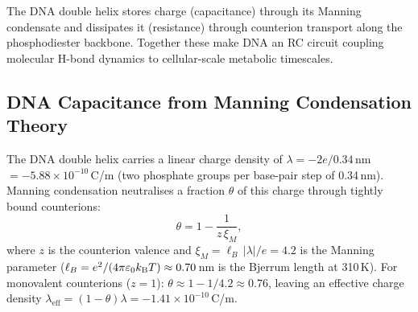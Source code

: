 The DNA double helix stores charge (capacitance) through its Manning condensate
and dissipates it (resistance) through counterion transport along the
phosphodiester backbone. Together these make DNA an RC circuit coupling
molecular H-bond dynamics to cellular-scale metabolic timescales.

\subsection{DNA Capacitance from Manning Condensation Theory}
\label{ssec:dna_capacitance}

The DNA double helix carries a linear charge density of
$\lambda = -2e / 0.34$\,nm $= -5.88 \times 10^{-10}$\,C/m (two phosphate
groups per base-pair step of 0.34\,nm). Manning condensation \citep{Manning1969}
neutralises a fraction $\theta$ of this charge through tightly bound counterions:
\begin{equation}
  \theta = 1 - \frac{1}{z\,\xi_M},
  \label{eq:manning_condensation}
\end{equation}
where $z$ is the counterion valence and $\xi_M = \ell_B\,|\lambda|/e = 4.2$
is the Manning parameter ($\ell_B = e^2/(4\pi\varepsilon_0k_{\mathrm{B}} T) \approx 0.70$\,nm
is the Bjerrum length at 310\,K). For monovalent counterions ($z = 1$):
$\theta \approx 1 - 1/4.2 \approx 0.76$, leaving an effective charge density
$\lambda_{\mathrm{eff}} = (1-\theta)\lambda = -1.41 \times 10^{-10}$\,C/m.

